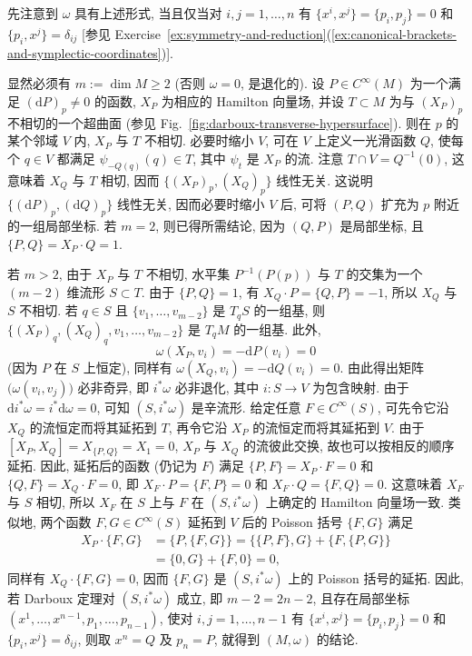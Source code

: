 \begin{RiemannProof}
先注意到 $\omega$ 具有上述形式, 当且仅当对 $i,j=1,\ldots,n$ 有 $\{x^i,x^j\}=\{p_i,p_j\}=0$ 和 $\{p_i,x^j\}=\delta_{ij}$ [参见 Exercise~\ref{ex:symmetry-and-reduction}(\ref{ex:canonical-brackets-and-symplectic-coordinates})].

显然必须有 $m:=\dim M\geq2$ (否则 $\omega=0$, 是退化的). 设 $P\in C^\infty(M)$ 为一个满足 $(\mathrm{d}P)_p\ne0$ 的函数, $X_P$ 为相应的 Hamilton 向量场, 并设 $T\subset M$ 为与 $(X_P)_p$ 不相切的一个超曲面 (参见 Fig.~\ref{fig:darboux-transverse-hypersurface}). 则在 $p$ 的某个邻域 $V$ 内, $X_P$ 与 $T$ 不相切. 必要时缩小 $V$, 可在 $V$ 上定义一光滑函数 $Q$, 使每个 $q\in V$ 都满足 $\psi_{-Q(q)}(q)\in T$, 其中 $\psi_t$ 是 $X_P$ 的流. 注意 $T\cap V=Q^{-1}(0)$, 这意味着 $X_Q$ 与 $T$ 相切, 因而 $\{(X_P)_p,(X_Q)_p\}$ 线性无关. 这说明 $\{(\mathrm{d}P)_p,(\mathrm{d}Q)_p\}$ 线性无关, 因而必要时缩小 $V$ 后, 可将 $(P,Q)$ 扩充为 $p$ 附近的一组局部坐标. 若 $m=2$, 则已得所需结论, 因为 $(Q,P)$ 是局部坐标, 且 $\{P,Q\}=X_P\cdot Q=1$.

若 $m>2$, 由于 $X_P$ 与 $T$ 不相切, 水平集 $P^{-1}(P(p))$ 与 $T$ 的交集为一个 $(m-2)$ 维流形 $S\subset T$. 由于 $\{P,Q\}=1$, 有 $X_Q\cdot P=\{Q,P\}=-1$, 所以 $X_Q$ 与 $S$ 不相切. 若 $q\in S$ 且 $\{v_1,\ldots,v_{m-2}\}$ 是 $T_qS$ 的一组基, 则 $\{(X_P)_q,(X_Q)_q,v_1,\ldots,v_{m-2}\}$ 是 $T_qM$ 的一组基. 此外,
\[
  \omega(X_P,v_i)=-\mathrm{d}P(v_i)=0
\]
(因为 $P$ 在 $S$ 上恒定), 同样有 $\omega(X_Q,v_i)=-\mathrm{d}Q(v_i)=0$. 由此得出矩阵 $\bigl(\omega(v_i,v_j)\bigr)$ 必非奇异, 即 $i^*\omega$ 必非退化, 其中 $i:S\to V$ 为包含映射. 由于 $\mathrm{d}i^*\omega=i^*\mathrm{d}\omega=0$, 可知 $(S,i^*\omega)$ 是辛流形. 给定任意 $F\in C^\infty(S)$, 可先令它沿 $X_Q$ 的流恒定而将其延拓到 $T$, 再令它沿 $X_P$ 的流恒定而将其延拓到 $V$. 由于 $[X_P,X_Q]=X_{\{P,Q\}}=X_1=0$, $X_P$ 与 $X_Q$ 的流彼此交换, 故也可以按相反的顺序延拓. 因此, 延拓后的函数 (仍记为 $F$) 满足 $\{P,F\}=X_P\cdot F=0$ 和 $\{Q,F\}=X_Q\cdot F=0$, 即 $X_F\cdot P=\{F,P\}=0$ 和 $X_F\cdot Q=\{F,Q\}=0$. 这意味着 $X_F$ 与 $S$ 相切, 所以 $X_F$ 在 $S$ 上与 $F$ 在 $(S,i^*\omega)$ 上确定的 Hamilton 向量场一致. 类似地, 两个函数 $F,G\in C^\infty(S)$ 延拓到 $V$ 后的 Poisson 括号 $\{F,G\}$ 满足
\begin{align*}
  X_P\cdot\{F,G\}
  &=\{P,\{F,G\}\}=\{\{P,F\},G\}+\{F,\{P,G\}\}\\
  &=\{0,G\}+\{F,0\}=0,
\end{align*}
同样有 $X_Q\cdot\{F,G\}=0$, 因而 $\{F,G\}$ 是 $(S,i^*\omega)$ 上的 Poisson 括号的延拓. 因此, 若 Darboux 定理对 $(S,i^*\omega)$ 成立, 即 $m-2=2n-2$, 且存在局部坐标 $(x^1,\ldots,x^{n-1},p_1,\ldots,p_{n-1})$, 使对 $i,j=1,\ldots,n-1$ 有 $\{x^i,x^j\}=\{p_i,p_j\}=0$ 和 $\{p_i,x^j\}=\delta_{ij}$, 则取 $x^n=Q$ 及 $p_n=P$, 就得到 $(M,\omega)$ 的结论.
\end{RiemannProof}

